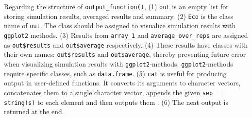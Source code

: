 \documentclass[11pt,a4paper]{article}
\begin{document}
Regarding the structure of \texttt{output\_function()}, (1) \texttt{out}
is an empty list for storing simulation results, averaged results and
summary. (2) \texttt{Eco} is the class name of \texttt{out}. The class
should be assigned to visualize simulation results with \texttt{ggplot2}
methods. (3) Results from \texttt{array\_1} and
\texttt{average\_over\_reps} are assigned as \texttt{out\$results} and
\texttt{out\$average} respectively. (4) These results have classes with
their own names: \texttt{out\$results} and \texttt{out\$average},
thereby preventing future error when visualizing simulation results with
\texttt{ggplot2}-methods. \texttt{ggplot2}-methods require specific
classes, such as \texttt{data.frame}. (5) \texttt{cat} is useful for
producing output in user-defined functions. It converts its arguments to
character vectors, concatenates them to a single character vector,
appends the given \texttt{sep} \(=\) \texttt{string(s)} to each element
and then outputs them \autocite{rdocumentation}. (6) The neat output is
returned at the end.
\end{document}
